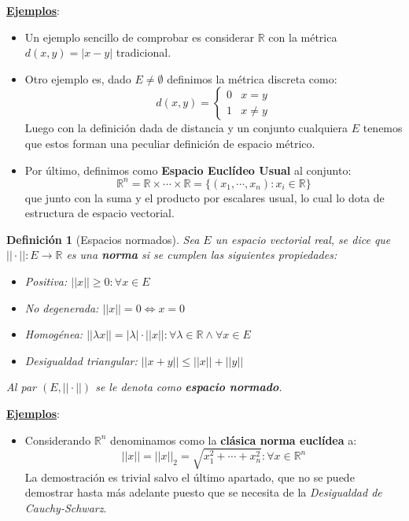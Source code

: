 \documentclass[10pt,a4paper,openright]{book}
\theoremstyle{break}
\newtheorem*{defi}{Definición}
\begin{document}
\underline{\textbf{Ejemplos}}:
\begin{itemize}
\item Un ejemplo sencillo de comprobar es considerar $\mathbb R$ con la métrica $d(x,y) = |x-y|$ tradicional.

\item Otro ejemplo es, dado $E\neq \emptyset$ definimos la métrica discreta como:
$$d(x,y) = \begin{cases} 0 & x= y \\ 1 & x\neq y \end{cases}$$
Luego con la definición dada de distancia y un conjunto cualquiera $E$ tenemos que estos forman una peculiar definición de espacio métrico.	

\item Por último, definimos como \textbf{Espacio Euclídeo Usual} al conjunto:
$$\mathbb R ^n = \mathbb R\times \cdots \times \mathbb R = \{(x_1, \cdots, x_n): x_i\in \mathbb R\}$$
que junto con la suma y el producto por escalares usual, lo cual lo dota de estructura de espacio vectorial.
\end{itemize}

\begin{defi}[Espacios normados]
Sea $E$ un espacio vectorial real, se dice que $||\cdot||: E \rightarrow \mathbb R$ es una \textbf{norma} si se cumplen las siguientes propiedades:
\begin{itemize}
\item Positiva: $||x||\geq 0: \forall x \in E$
\item No degenerada: $||x|| = 0 \Leftrightarrow x = 0$
\item Homogénea: $||\lambda x|| = |\lambda| \cdot ||x||: \forall \lambda \in \mathbb R \wedge \forall x \in E$
\item Desigualdad triangular: $||x+y||\leq ||x|| + ||y||$
\end{itemize}
Al par $(E,||\cdot||)$ se le denota como \textbf{espacio normado}.
\end{defi}

\underline{\textbf{Ejemplos}}:
\begin{itemize}
\item Considerando $\mathbb R^n$ denominamos como la \textbf{clásica norma euclídea} a:
$$||x|| = ||x||_2 = \sqrt{x_1^2+\cdots + x_n^2} : \forall x \in \mathbb R^n $$
La demostración es trivial salvo el último apartado, que no se puede demostrar hasta más adelante puesto que se necesita de la \textit{Desigualdad de Cauchy-Schwarz}.
\end{itemize}
\end{document}
